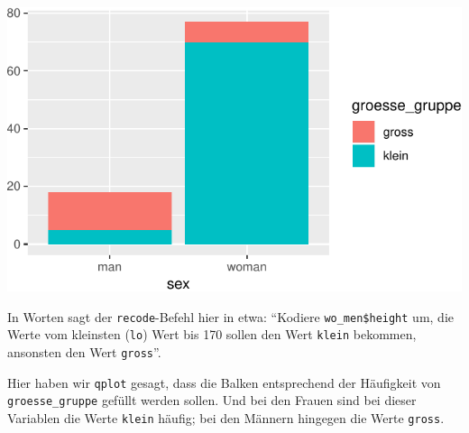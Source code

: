 \documentclass[12pt,ngerman,paper=a4,pagesize,DIV=13]{scrreprt}
\newenvironment{Shaded}{\begin{snugshade}}{\end{snugshade}}
\newcommand{\DataTypeTok}[1]{\textcolor[rgb]{0.13,0.29,0.53}{#1}}
\newcommand{\DecValTok}[1]{\textcolor[rgb]{0.00,0.00,0.81}{#1}}
\newcommand{\KeywordTok}[1]{\textcolor[rgb]{0.13,0.29,0.53}{\textbf{#1}}}
\newcommand{\NormalTok}[1]{#1}
\newcommand{\OperatorTok}[1]{\textcolor[rgb]{0.81,0.36,0.00}{\textbf{#1}}}
\newcommand{\StringTok}[1]{\textcolor[rgb]{0.31,0.60,0.02}{#1}}
\begin{document}
\begin{Shaded}
\end{Shaded}

\includegraphics{DatenerhebungStatistik-Uebung_files/figure-latex/unnamed-chunk-252-1.pdf}

In Worten sagt der \texttt{recode}-Befehl hier in etwa: \enquote{Kodiere
\texttt{wo\_men\$height} um, die Werte vom kleinsten (\texttt{lo}) Wert
bis 170 sollen den Wert \texttt{klein} bekommen, ansonsten den Wert
\texttt{gross}}.

Hier haben wir \texttt{qplot} gesagt, dass die Balken entsprechend der
Häufigkeit von \texttt{groesse\_gruppe} gefüllt werden sollen. Und bei
den Frauen sind bei dieser Variablen die Werte \texttt{klein} häufig;
bei den Männern hingegen die Werte \texttt{gross}.
\end{document}
